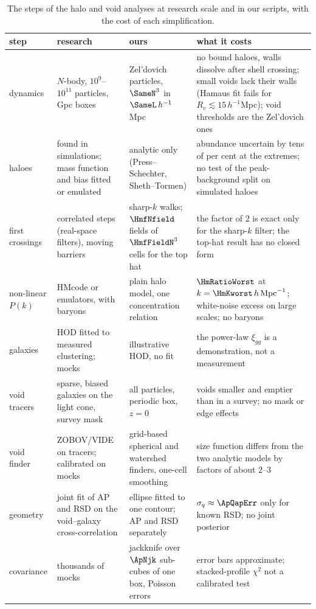 \begin{table}[htbp]
\centering
\small
\begin{tabular}{p{2.0cm}p{3.6cm}p{3.6cm}p{4.0cm}}
\hline
step & research & ours & what it costs \\
\hline
dynamics & $N$-body, $10^9$--$10^{11}$ particles, Gpc boxes &
Zel'dovich particles, $\SameN^3$ in $\SameL\,h^{-1}$Mpc &
no bound haloes, walls dissolve after shell crossing; small voids lack their walls
(Hamaus fit fails for $R_v\lesssim15\,h^{-1}$Mpc); void thresholds are the
Zel'dovich ones \\
haloes & found in simulations; mass function and bias fitted or emulated &
analytic only (Press--Schechter, Sheth--Tormen) &
abundance uncertain by tens of per cent at the extremes; no test of the
peak-background split on simulated haloes \\
first crossings & correlated steps (real-space filters), moving barriers &
sharp-$k$ walks; $\HmfNfield$ fields of $\HmfFieldN^3$ cells for the top hat &
the factor of $2$ is exact only for the sharp-$k$ filter; the top-hat result has no
closed form \\
non-linear $P(k)$ & HMcode or emulators, with baryons &
plain halo model, one concentration relation &
$\HmRatioWorst$ at $k=\HmKworst\,h\,\mathrm{Mpc}^{-1}$; white-noise excess on
large scales; no baryons \\
galaxies & HOD fitted to measured clustering; mocks &
illustrative HOD, no fit &
the power-law $\xi_{gg}$ is a demonstration, not a measurement \\
void tracers & sparse, biased galaxies on the light cone, survey mask &
all particles, periodic box, $z=0$ &
voids smaller and emptier than in a survey; no mask or edge effects \\
void finder & ZOBOV/VIDE on tracers; calibrated on mocks &
grid-based spherical and watershed finders, one-cell smoothing &
size function differs from the two analytic models by factors of about $2$--$3$ \\
geometry & joint fit of AP and RSD on the void--galaxy cross-correlation &
ellipse fitted to one contour; AP and RSD separately &
$\sigma_q\approx\ApQapErr$ only for known RSD; no joint posterior \\
covariance & thousands of mocks & jackknife over $\ApNjk$ sub-cubes of one box, Poisson errors &
error bars approximate; stacked-profile $\chi^2$ not a calibrated test \\
\hline
\end{tabular}
\caption{The steps of the halo and void analyses at research scale and in our
scripts, with the cost of each simplification.}
\label{11b:tab:nerfs}
\end{table}

